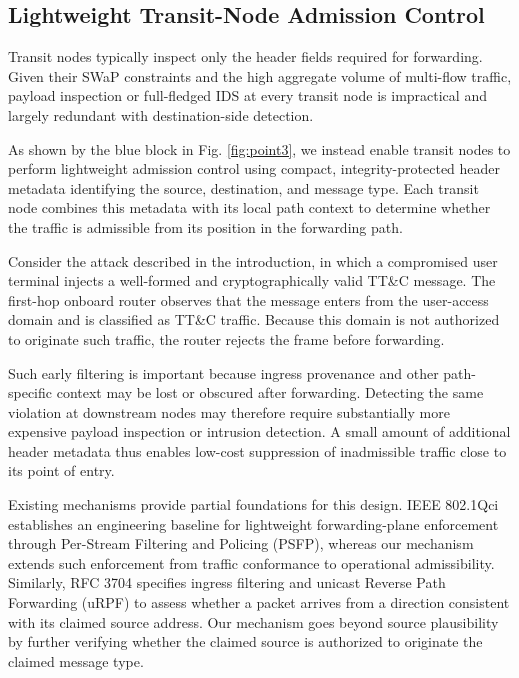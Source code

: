 \documentclass[journal]{IEEEtran}
\begin{document}
\subsection{Lightweight Transit-Node Admission Control}
\label{subsection:ponit3-2transit}

Transit nodes typically inspect only the header fields required for forwarding.
Given their SWaP constraints and the high aggregate volume of multi-flow traffic, payload inspection or full-fledged IDS at every transit node is impractical and largely redundant with destination-side detection.

As shown by the blue block in Fig. \ref{fig:point3}, we instead enable transit nodes to perform lightweight admission control using compact, integrity-protected header metadata identifying the source, destination, and message type.
Each transit node combines this metadata with its local path context to determine whether the traffic is admissible from its position in the forwarding path.

Consider the attack described in the introduction, in which a compromised user terminal injects a well-formed and cryptographically valid TT\&C message.
The first-hop onboard router observes that the message enters from the user-access domain and is classified as TT\&C traffic.
Because this domain is not authorized to originate such traffic, the router rejects the frame before forwarding.

Such early filtering is important because ingress provenance and other path-specific context may be lost or obscured after forwarding.
Detecting the same violation at downstream nodes may therefore require substantially more expensive payload inspection or intrusion detection.
A small amount of additional header metadata thus enables low-cost suppression of inadmissible traffic close to its point of entry.

Existing mechanisms provide partial foundations for this design.
IEEE 802.1Qci \cite{ieee8021qci} establishes an engineering baseline for lightweight forwarding-plane enforcement through Per-Stream Filtering and Policing (PSFP), whereas our mechanism extends such enforcement from traffic conformance to operational admissibility.
Similarly, RFC 3704 \cite{rfc3704} specifies ingress filtering and unicast Reverse Path Forwarding (uRPF) to assess whether a packet arrives from a direction consistent with its claimed source address.
Our mechanism goes beyond source plausibility by further verifying whether the claimed source is authorized to originate the claimed message type.
\end{document}
